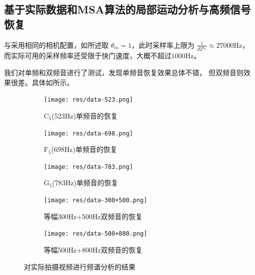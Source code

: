 \subsection{基于实际数据和MSA算法的局部运动分析与高频信号恢复
    \label{sec:data-local}}
与采用相同的相机配置，如所述取
$\theta_m=1$，此时采样率上限为
$\frac{1}{d2^{\theta_m}} \approx 27000$Hz，
而实际可用的采样频率还受限于快门速度，大概不超过$1000$Hz。

我们对单频和双频音进行了测试，发现单频音恢复效果总体不错，
但双频音则效果很差。具体如所示。
\begin{figure}[h!]\begin{center}
    \begin{subfigure}[b]{.33\figwidth}
        \texttt{[image: res/data-523.png]}
        \caption{$\text{C}_5$(523Hz)单频音的恢复}
    \end{subfigure}
    \begin{subfigure}[b]{.33\figwidth}
        \texttt{[image: res/data-698.png]}
        \caption{$\text{F}_5$(698Hz)单频音的恢复}
    \end{subfigure}
    \begin{subfigure}[b]{.33\figwidth}
        \texttt{[image: res/data-783.png]}
        \caption{$\text{G}_5$(783Hz)单频音的恢复}
    \end{subfigure}
    \begin{subfigure}[b]{.4\figwidth}
        \texttt{[image: res/data-300+500.png]}
        \caption{等幅300Hz+500Hz双频音的恢复}
        \label{fig:real:300+500}
    \end{subfigure}
    \begin{subfigure}[b]{.4\figwidth}
        \texttt{[image: res/data-500+800.png]}
        \caption{等幅500Hz+800Hz双频音的恢复}
    \end{subfigure}
    \caption{对实际拍摄视频进行频谱分析的结果}
    \label{fig:real:highfreq}
\end{center}\end{figure}

